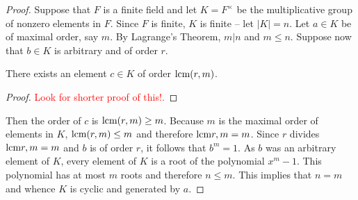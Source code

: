 \documentclass[../AlgebraQualSolutions.tex]{subfiles}
\begin{document}
\begin{proof}
	Suppose that $F$ is a finite field and let $K = F^\times$ be the multiplicative group of nonzero elements in $F$. Since $F$ is finite, $K$ is finite -- let $|K| = n$. Let $a \in K$ be of maximal order, say $m$. By Lagrange's Theorem, $m | n$ and $m \leq n$. Suppose now that $b \in K$ is arbitrary and of order $r$.

	\begin{claim}
		There exists an element $c \in K$ of order $\textrm{lcm}(r,m)$.

		\begin{proof}
			\textcolor{red}{Look for shorter proof of this!.}
		\end{proof}
	\end{claim}

	Then the order of $c$ is $\textrm{lcm}(r,m) \geq m$. Because $m$ is the maximal order of elements in $K$, $\textrm{lcm}(r,m) \leq m$ and therefore $\textrm{lcm}{r,m} = m$. Since $r$ divides $\textrm{lcm}{r,m} = m$ and $b$ is of order $r$, it follows that $b^m = 1$. As $b$ was an arbitrary element of $K$, every element of $K$ is a root of the polynomial $x^m - 1$. This polynomial has at most $m$ roots and therefore $n \leq m$. This implies that $n = m$ and whence $K$ is cyclic and generated by $a$.
\end{proof}
\end{document}
